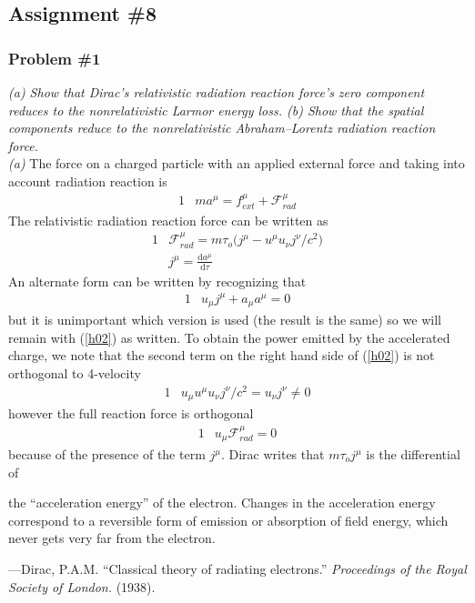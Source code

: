 \documentclass[]{article}
\numberwithin{equation}{subsection}
\begin{document}
\subsection{Assignment \#8}
\subsubsection*{Problem \#1}
\emph{(a) Show that Dirac's relativistic radiation reaction force's zero component reduces to the nonrelativistic Larmor energy loss. (b) Show that the spatial components reduce to the nonrelativistic Abraham--Lorentz radiation reaction force.}\\

\noindent \emph{(a)} The force on a charged particle with an applied external force and taking into account radiation reaction is
	\begin{alignat}{1}
	\label{h01}		&ma^{\mu}=f^{\mu}_{ext}+\mathcal{F}_{rad}^{\mu}
	\end{alignat}
The relativistic radiation reaction force can be written as
	\begin{alignat}{1}
	\label{h02}		&\mathcal{F}_{rad}^{\mu}=m\tau_{o}\Big(j^{\mu}-u^{\mu}u_{\nu}j^{\nu}/c^{2}\Big)\\
	\label{h03}		&j^{\mu}=\frac{\mathrm{d}a^{\mu}}{\mathrm{d}\tau}
	\end{alignat}
An alternate form can be written by recognizing that
	\begin{alignat}{1}
	\label{h04}		&u_{\mu}j^{\mu}+a_{\mu}a^{\mu}=0
	\end{alignat}
but it is unimportant which version is used (the result is the same) so we will remain with (\ref{h02}) as written. To obtain the power emitted by the accelerated charge, we note that the second term on the right hand side of (\ref{h02}) is not orthogonal to 4-velocity
	\begin{alignat}{1}
	\label{h05}		&u_{\mu}u^{\mu}u_{\nu}j^{\nu}/c^{2}=u_{\nu}j^{\nu}\neq0
	\end{alignat}
however the full reaction force is orthogonal
	\begin{alignat}{1}
	\label{h06}		&u_{\mu}\mathcal{F}_{rad}^{\mu}=0
	\end{alignat}
because of the presence of the term $j^{\mu}$. Dirac writes that $m\tau_{o}j^{\mu}$ is the differential of 
\begin{displayquote}
the ``acceleration energy'' of the electron. Changes in the acceleration energy correspond to a reversible form of emission or absorption of field energy, which never gets very far from the electron.
\end{displayquote}
\indent---Dirac, P.A.M. ``Classical theory of radiating electrons.'' \emph{Proceedings of the Royal Society of London.} (1938).\\
\end{document}
